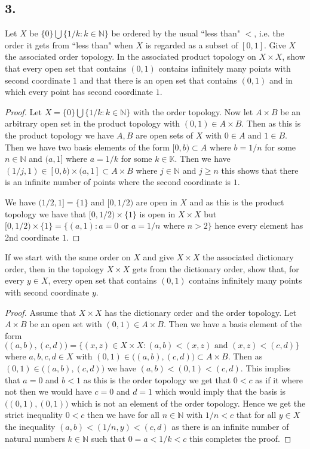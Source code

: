\documentclass{amsart}
\theoremstyle{plain}
\theoremstyle{definition}
\theoremstyle{remark}
\begin{document}
\vspace{.15in}

\noindent
\subsection*{3.} Let $X$ be $\{0\} \bigcup \{ 1/k : k\in \mathbb N \}$ be ordered by the usual ``less than" $<$, i.e. the order it gets from ``less than" when $X$ is regarded as a subset of $[0,1]$. Give $X$ the associated order topology. In the associated product topology on $X\times X$, show that every open set that contains $(0,1)$ contains infinitely many points with second coordinate $1$ and that there is an open set that contains $(0,1)$ and in which every point has second coordinate $1$. 

\begin{proof}
    Let $X= \{0\}\bigcup \{1/k:k\in \mathbb{N}\}$ with the order topology. Now let $A\times B$ be an arbitrary open set in the product topology with $(0,1)\in A\times B$. Then as this is the product topology we have $A,B$ are open sets of $X$ with $0\in A$ and $1\in B$. Then we have two basis elements of the form $[0,b)\subset A$ where $b=1/n$ for some $n\in \mathbb{N}$ and $(a,1]$ where $a=1/k$ for some $k\in \mathbb{K}$. Then we have $(1/j,1)\in [0,b)\times (a,1]\subset A\times B$ where $j\in \mathbb{N}$ and $j\geq n$ this shows that there is an infinite number of points where the second coordinate is $1$. 
    
    We have $(1/2,1]=\{1\}$ and $[0,1/2)$ are open in $X$ and as this is the product topology we have that $[0,1/2)\times \{1\}$ is open in $X\times X$ but $[0,1/2)\times \{1\}=\{(a,1):a=0\text{ or } a=1/n\text{ where }n>2\}$ hence every element has 2nd coordinate $1$.
\end{proof}

If we start with the same order on $X$ and give $X\times X$ the associated dictionary order, then in the topology $X\times X$ gets from the dictionary order, show that, for every $y\in X$, every open set that contains $(0,1)$ contains infinitely many points with second coordinate $y$.

\begin{proof}
    Assume that $X\times X$ has the dictionary order and the order topology. Let $A\times B$ be an open set with $(0,1)\in A\times B$. Then we have a basis element of the form $\big((a,b),(c,d)\big)=\{(x,z)\in X\times X: (a,b)< (x,z)\text{ and }(x,z)<(c,d)\}$ where $a,b,c,d\in X$ with $(0,1)\in \big((a,b),(c,d)\big)\subset A\times B$. Then as $(0,1)\in \big((a,b),(c,d)\big)$ we have $(a,b)<(0,1)<(c,d)$. This implies that $a=0$ and $b<1$ as this is the order topology we get that $0<c$ as if it where not then we would have $c=0$ and $d=1$ which would imply that the basis is $\big((0,1),(0,1)\big)$ which is not an element of the order topology. Hence we get the strict inequality $0<c$ then we have for all $n\in \mathbb{N}$ with $1/n<c$ that for all $y\in X$ the inequality $(a,b)<(1/n,y)<(c,d)$ as there is an infinite number of natural numbers $k\in \mathbb{N}$ such that $0=a<1/k<c$ this completes the proof.



\end{proof}
\end{document}
